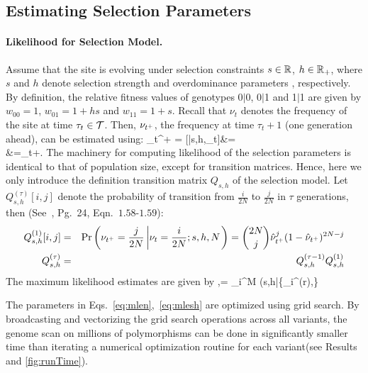 \subsection{Estimating Selection Parameters}

\paragraph{Likelihood for Selection Model.}
Assume that the site is evolving under selection constraints $s\in
{\mathbb R}$, $h\in {\mathbb R}_+$, where $s$ and $h$ denote selection strength and 
overdominance parameters ,
respectively. By definition, the relative fitness values of genotypes
0$|$0, 0$|$1 and 1$|$1 are given by $w_{00}=1$, $w_{01}=1+hs$ and
$w_{11}=1+s$. Recall that $\nu_t$ denotes the frequency of the site at
time $\tau_t\in {\cal T}$. Then, $\nu_{t^+}$, the frequency at time
$\tau_{t}+1$ (one generation ahead), can be estimated using: 
\beq 
\hat{\nu}_{t^+} =
[\nusp|s,h,\nu_t]&=\\
&=\nu_t+.
  \label{eq:transition}
\eeq
The machinery for computing likelihood of the selection parameters is 
identical to that of population size, except for transition matrices. Hence, here 
we only introduce the definition transition matrix $Q_{s,h}$ of the selection 
model.
Let $Q^{(\tau)}_{s,h}[i,j]$ denote the
probability of transition from $\frac{i}{2N}$ to $\frac{j}{2N}$ in
$\tau$ generations, then (See~\cite{Ewens2012Mathematical}, Pg.~24, 
Eqn.~$1.58$-$1.59$):
\begin{eqnarray}
  Q^{(1)}_{s,h}[i,j] &=& \operatorname{Pr}\left(\nu_{t^+}=\frac{j}{2N} \left\lvert
      \nu_{t}=\frac{i}{2N};s,h,N \right .\right)={2N \choose j}
  \hat{\nu}_{t^+}^{j} (1-\hat{\nu}_{t^+})^{2N-j}\label{eq:Q1}\\
  Q^{(\tau)}_{s,h} &=& Q^{(\tau-1)}_{s,h}Q^{(1)}_{s,h}\label{eq:Qt}
  \label{eq:mkvs}   
\end{eqnarray}
The maximum likelihood estimates are given by
\beq
\hs,\hh =  \prod_i^M \Lc(s,h|\{_i^{(r)},\hN\} 
\label{eq:mlesh}
\eeq

 The parameters in
 Eqs.~\ref{eq:mlen},~\ref{eq:mlesh} are optimized using grid
 search. By broadcasting and vectorizing the grid search operations
 across all variants, the genome scan on millions of polymorphisms can
 be done in significantly smaller time than iterating a numerical
 optimization routine for each variant(see Results and
 \ref{fig:runTime}).

